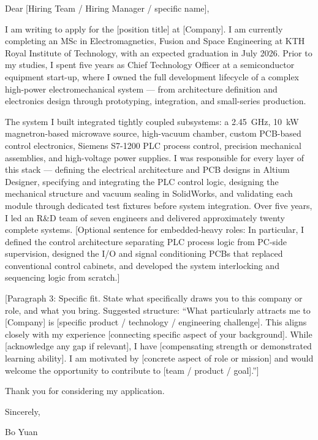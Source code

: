 \documentclass[a4paper,11pt]{article}
\begin{document}
\noindent
Dear [Hiring Team / Hiring Manager / specific name],

\vspace{0.4cm}

I am writing to apply for the [position title] at [Company].
I am currently completing an MSc in Electromagnetics, Fusion and Space Engineering
at KTH Royal Institute of Technology, with an expected graduation in July 2026.
Prior to my studies, I spent five years as Chief Technology Officer at a
semiconductor equipment start-up, where I owned the full development lifecycle of a
complex high-power electromechanical system --- from architecture definition and
electronics design through prototyping, integration, and small-series production.

\vspace{0.3cm}

The system I built integrated tightly coupled subsystems: a 2.45~GHz, 10~kW
magnetron-based microwave source, high-vacuum chamber, custom PCB-based control
electronics, Siemens S7-1200 PLC process control, precision mechanical assemblies,
and high-voltage power supplies. I was responsible for every layer of this stack ---
defining the electrical architecture and PCB designs in Altium Designer, specifying
and integrating the PLC control logic, designing the mechanical structure and
vacuum sealing in SolidWorks, and validating each module through dedicated test
fixtures before system integration. Over five years, I led an R\&D team of seven
engineers and delivered approximately twenty complete systems.
[Optional sentence for embedded-heavy roles: In particular, I defined the
control architecture separating PLC process logic from PC-side supervision,
designed the I/O and signal conditioning PCBs that replaced conventional
control cabinets, and developed the system interlocking and sequencing logic
from scratch.]

\vspace{0.3cm}

[Paragraph 3: Specific fit. State what specifically draws you to this company or
role, and what you bring. Suggested structure: ``What particularly attracts me to
[Company] is [specific product / technology / engineering challenge]. This aligns
closely with my experience [connecting specific aspect of your background]. While
[acknowledge any gap if relevant], I have [compensating strength or demonstrated
learning ability]. I am motivated by [concrete aspect of role or mission] and would
welcome the opportunity to contribute to [team / product / goal].'']

\vspace{0.3cm}

Thank you for considering my application.

\vspace{0.6cm}

\noindent
Sincerely, \\

\vspace{0.3cm}

\noindent
Bo Yuan
\end{document}
